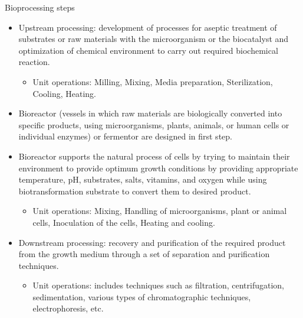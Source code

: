 \documentclass[
  ignorenonframetext,
  aspectratio=169]{beamer}
\providecommand{\tightlist}{%
  \setlength{\itemsep}{0pt}\setlength{\parskip}{0pt}}
\begin{document}
\begin{frame}{Bioprocessing steps}
\protect\hypertarget{bioprocessing-steps}{}
\footnotesize

\begin{itemize}
\tightlist
\item
  Upstream processing: development of processes for aseptic treatment of
  substrates or raw materials with the microorganism or the biocatalyst
  and optimization of chemical environment to carry out required
  biochemical reaction.

  \begin{itemize}
  \tightlist
  \item
    Unit operations: Milling, Mixing, Media preparation, Sterilization,
    Cooling, Heating.
  \end{itemize}
\item
  \alert{Bioreactor} (vessels in which raw materials are biologically
  converted into specific products, using microorganisms, plants,
  animals, or human cells or individual enzymes) or fermentor are
  designed in first step.
\item
  Bioreactor supports the natural process of cells by trying to maintain
  their environment to provide optimum growth conditions by providing
  appropriate temperature, pH, substrates, salts, vitamins, and oxygen
  while using biotransformation substrate to convert them to desired
  product.

  \begin{itemize}
  \tightlist
  \item
    Unit operations: Mixing, Handling of microorganisms, plant or animal
    cells, Inoculation of the cells, Heating and cooling.
  \end{itemize}
\item
  Downstream processing: recovery and purification of the required
  product from the growth medium through a set of separation and
  purification techniques.

  \begin{itemize}
  \tightlist
  \item
    Unit operations: includes techniques such as filtration,
    centrifugation, sedimentation, various types of chromatographic
    techniques, electrophoresis, etc.
  \end{itemize}
\end{itemize}
\end{frame}
\end{document}
